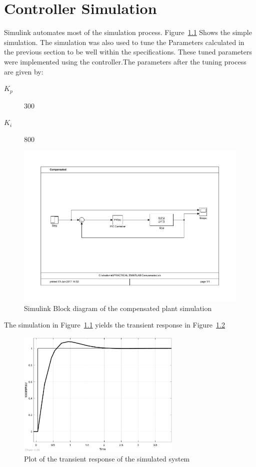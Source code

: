 \chapter{Controller Simulation}
Simulink automates most of the simulation process. Figure~\ref{fig:simblockdiagram} Shows the simple simulation. The simulation was also used to tune the Parameters calculated in the previous section to be well within the specifications. These tuned parameters were implemented using the controller.The parameters after the tuning process are given by:
\begin{description}
	\item[$K_p$] 300 
	\item[$K_i$] 800
\end{description}
\begin{figure}[h]
	\includegraphics[clip,width=1\textwidth]{gfx/sim_Block_Diagram.pdf}%
		\caption{Simulink Block diagram of the compensated plant simulation }
\label{fig:simblockdiagram}
\end{figure}

The simulation in Figure~\ref{fig:simblockdiagram} yields the transient response in Figure~\ref{fig:simbtransplot}

\begin{figure}[h]
		\includegraphics[clip,width=0.7\textwidth]{gfx/sim_plot}%
		\caption{Plot of the transient response of the simulated system}
\label{fig:simbtransplot}
\end{figure}

